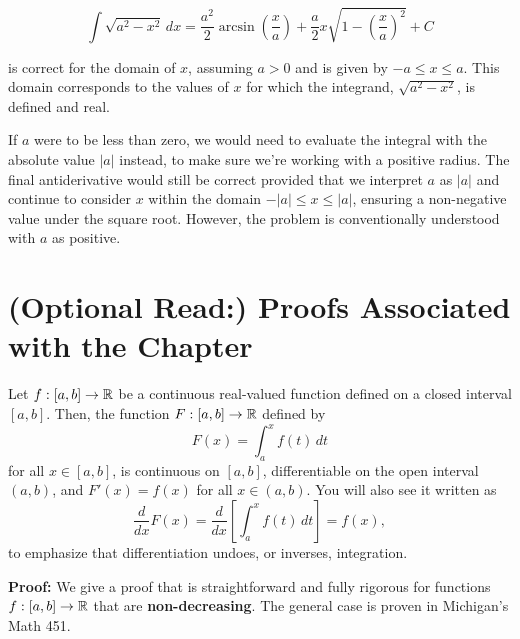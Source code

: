 \[
\int \sqrt{a^2 - x^2} \, dx = \frac{a^2}{2} \arcsin\left(\frac{x}{a}\right) + \frac{a}{2} x\sqrt{1 - \left(\frac{x}{a}\right)^2} + C
\]

is correct for the domain of \( x \), assuming \( a > 0 \) and is given by \( -a \leq x \leq a \). This domain corresponds to the values of \( x \) for which the integrand, \( \sqrt{a^2 - x^2} \), is defined and real.

If \( a \) were to be less than zero, we would need to evaluate the integral with the absolute value \( |a| \) instead, to make sure we're working with a positive radius. The final antiderivative would still be correct provided that we interpret \( a \) as \( |a| \) and continue to consider \( x \) within the domain \( -|a| \leq x \leq |a| \), ensuring a non-negative value under the square root. However, the problem is conventionally understood with \( a \) as positive.

\section{(Optional Read:) Proofs Associated with the Chapter}

\begin{tcolorbox}[title=\textcolor{black}{Proof of Prop.~\ref{thm:FundamentalTheoremsCalculus} (First Fundamental Theorem of Calculus)}, sharp corners, colback=green!30, colframe=green!80!blue, breakable, fonttitle=\bfseries]

Let \( f:[a, b] \to \mathbb R \) be a continuous real-valued function defined on a closed interval \([a, b]\). Then, the function \( F:[a, b] \to \mathbb R \) defined by
\begin{equation}
    \label{eq:FirstFundThmCalculusVo1B}
F(x) = \int_a^x f(t) \, dt
\end{equation}
for all \( x \in [a, b]\), is continuous on \([a, b]\), differentiable on the open interval \( (a, b) \), and \( F'(x) = f(x) \) for all \( x \in  (a, b) \). You will also see it written as 
\begin{equation}
    \label{eq:FirstFundThmCalculusVo2B}
   \frac{d}{dx}  F(x) =  \frac{d}{dx} \left[ \int_a^x f(t) \, dt \right] = f(x),
\end{equation}
to emphasize that differentiation undoes, or inverses, integration.
\\

\end{tcolorbox}

\bigskip


\textbf{Proof:} We give a proof that is straightforward and fully rigorous for functions $f:[a, b] \to \mathbb R$ that are \textbf{non-decreasing}. The general case is proven in Michigan's Math 451.

